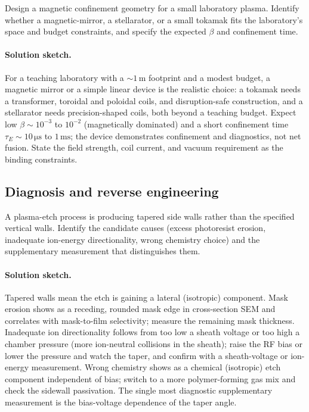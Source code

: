 \begin{exercise}
Design a magnetic confinement geometry for a small laboratory
plasma. Identify whether a magnetic-mirror, a stellarator, or a
small tokamak fits the laboratory's space and budget constraints,
and specify the expected $\beta$ and confinement time.
\paragraph{Solution sketch.} For a teaching laboratory with a $\sim 1\,
\si{\meter}$ footprint and a modest budget, a magnetic mirror or a simple
linear device is the realistic choice: a tokamak needs a transformer,
toroidal and poloidal coils, and disruption-safe construction, and a
stellarator needs precision-shaped coils, both beyond a teaching budget.
Expect low $\beta\sim 10^{-3}$ to $10^{-2}$ (magnetically dominated) and a
short confinement time $\tau_{E}\sim 10\,\si{\micro\second}$ to
$1\,\si{\milli\second}$; the device demonstrates confinement and
diagnostics, not net fusion. State the field strength, coil current, and
vacuum requirement as the binding constraints.
\end{exercise}

\subsection*{Diagnosis and reverse engineering}

\begin{exercise}
A plasma-etch process is producing tapered side walls rather than
the specified vertical walls. Identify the candidate causes (excess
photoresist erosion, inadequate ion-energy directionality, wrong
chemistry choice) and the supplementary measurement that
distinguishes them.
\paragraph{Solution sketch.} Tapered walls mean the etch is gaining a
lateral (isotropic) component. Mask erosion shows as a receding, rounded
mask edge in cross-section SEM and correlates with mask-to-film selectivity;
measure the remaining mask thickness. Inadequate ion directionality
follows from too low a sheath voltage or too high a chamber pressure
(more ion-neutral collisions in the sheath); raise the RF bias or lower
the pressure and watch the taper, and confirm with a sheath-voltage or
ion-energy measurement. Wrong chemistry shows as a chemical (isotropic)
etch component independent of bias; switch to a more polymer-forming gas
mix and check the sidewall passivation. The single most diagnostic
supplementary measurement is the bias-voltage dependence of the taper
angle.
\end{exercise}

